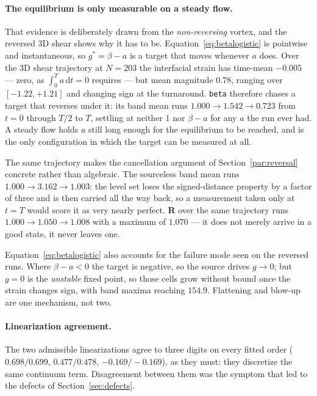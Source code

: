 \documentclass[preprint,3p,11pt]{elsarticle}
\begin{document}
\paragraph{The equilibrium is only measurable on a steady flow.}
That evidence is deliberately drawn from the \emph{non-reversing} vortex, and
the reversed 3D shear shows why it has to be. Equation~\eqref{eq:betalogistic}
is pointwise and instantaneous, so $g^{*} = \beta - a$ is a target that moves
whenever $a$ does. Over the 3D shear trajectory at $N=203$ the interfacial
strain has time-mean $-0.005$ --- zero, as $\int_0^T a\,\mathrm dt = 0$
requires --- but mean magnitude $0.78$, ranging over $[-1.22, +1.21]$ and
changing sign at the turnaround. \texttt{beta} therefore chases a target that
reverses under it: its band mean runs $1.000 \to 1.542 \to 0.723$ from $t=0$
through $T/2$ to $T$, settling at neither $1$ nor $\beta - a$ for any $a$ the
run ever had. A steady flow holds $a$ still long enough for the equilibrium to
be reached, and is the only configuration in which the target can be measured
at all.

The same trajectory makes the cancellation argument of
Section~\ref{par:reversal} concrete rather than algebraic. The sourceless band
mean runs $1.000 \to 3.162 \to 1.003$: the level set loses the signed-distance
property by a factor of three and is then carried all the way back, so a
measurement taken only at $t=T$ would score it as very nearly perfect.
\textbf{R} over the same trajectory runs $1.000 \to 1.050 \to 1.008$ with a
maximum of $1.070$ --- it does not merely arrive in a good state, it never
leaves one.

Equation~\eqref{eq:betalogistic} also accounts for the failure mode seen on the
reversed runs. Where $\beta - a < 0$ the target is negative, so the source
drives $g \to 0$; but $g = 0$ is the \emph{unstable} fixed point, so those cells
grow without bound once the strain changes sign, with band maxima reaching
$154.9$. Flattening and blow-up are one mechanism, not two.

\paragraph{Linearization agreement.}
The two admissible linearizations agree to three digits on every fitted order
($0.698/0.699$, $0.477/0.478$, $-0.169/-0.169$), as they must: they discretize
the same continuum term. Disagreement between them was the symptom that led to
the defects of Section~\ref{sec:defects}.
\end{document}
